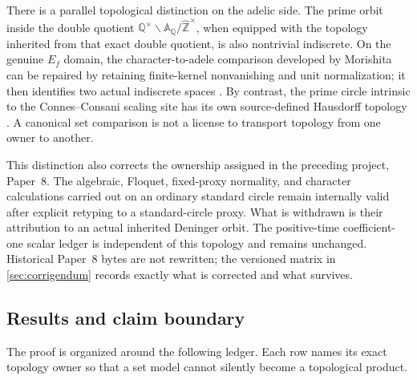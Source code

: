 \documentclass[11pt]{article}
\theoremstyle{definition}
\newcommand{\A}{\mathbb{A}}
\newcommand{\Q}{\mathbb{Q}}
\newcommand{\Zhat}{\widehat{\mathbb Z}}
\begin{document}
There is a parallel topological distinction on the adelic side.  The prime orbit inside the double quotient \(\Q^\times\backslash\A_{\Q}/\Zhat^\times\), when equipped with the topology inherited from that exact double quotient, is also nontrivial indiscrete.  On the genuine \(E_f\) domain, the character-to-adele comparison developed by Morishita can be repaired by retaining finite-kernel nonvanishing and unit normalization; it then identifies two actual indiscrete spaces \cite[Eq.~(1.1.5), physical p.~5; Remark~2.1.13, p.~13; Lemmas~3.4--3.5 and Theorem~3.6, pp.~23--25]{Morishita2026}.  By contrast, the prime circle intrinsic to the Connes--Consani scaling site has its own source-defined Hausdorff topology \cite[Lemma~6.3(i), physical p.~5]{ConnesConsani2016}.  A canonical set comparison is not a license to transport topology from one owner to another.

This distinction also corrects the ownership assigned in the preceding project, Paper~8.  The algebraic, Floquet, fixed-proxy normality, and character calculations carried out on an ordinary standard circle remain internally valid after explicit retyping to a standard-circle proxy.  What is withdrawn is their attribution to an actual inherited Deninger orbit.  The positive-time coefficient-one scalar ledger is independent of this topology and remains unchanged.  Historical Paper~8 bytes are not rewritten; the versioned matrix in \cref{sec:corrigendum} records exactly what is corrected and what survives.

\subsection{Results and claim boundary}

The proof is organized around the following ledger.  Each row names its exact topology owner so that a set model cannot silently become a topological product.
\end{document}
